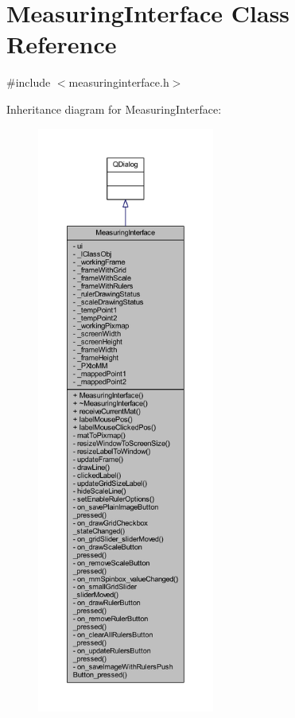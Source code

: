 \hypertarget{classMeasuringInterface}{}\section{Measuring\+Interface Class Reference}
\label{classMeasuringInterface}


{\ttfamily \#include $<$measuringinterface.\+h$>$}



Inheritance diagram for Measuring\+Interface\+:
\nopagebreak
\begin{figure}[H]
\begin{center}
\leavevmode
\includegraphics[height=550pt]{classMeasuringInterface__inherit__graph}
\end{center}
\end{figure}


